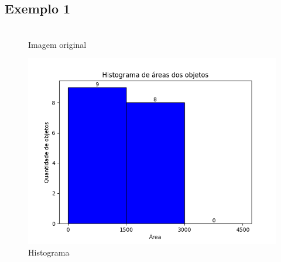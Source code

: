 \documentclass[12pt, letterpaper]{article}
\begin{document}
    \subsection{Exemplo 1}
    \begin{figure}[H]
    \centering
    \begin{minipage}{.45\textwidth}
        \centering
        \\ {Imagem original}
    \end{minipage}
    \begin{minipage}{.5\textwidth}
        \centering
        {\includegraphics[width=1\linewidth]{processed/objetos1/histogram.png}}
        \\ {Histograma}
    \end{minipage}
    \end{figure}
\end{document}
